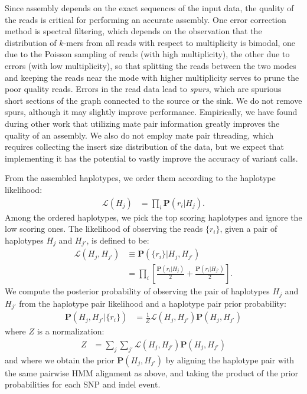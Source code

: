 \documentclass{acm_proc_article-sp}
\begin{document}
Since assembly depends on the exact sequences of the input data, the quality of
the reads is critical for performing an accurate assembly.
One error correction method is spectral filtering, which depends on the
observation that the distribution of $k$-mers from all reads with respect to
multiplicity is bimodal, one due to the Poisson sampling of reads (with high
multiplicity), the other due to errors (with low multiplicity), so that splitting
the reads between the two modes and keeping the reads near the mode with higher
multiplicity serves to prune the poor quality reads. %
Errors in the read data lead to \emph{spurs}, which are spurious short sections
of the graph connected to the source or the sink.
We do not remove spurs, although it may slightly improve performance.
Empirically, we have found during other work that utilizing mate pair
information greatly improves the quality of an assembly. %
We also do not employ mate pair threading, which requires collecting the
insert size distribution of the data, but we expect that implementing it has
the potential to vastly improve the accuracy of variant calls.

From the assembled haplotypes, we order them according to the haplotype
likelihood:
\begin{align}
  \mathcal L(H_j)
  &=\prod_i\mathbf P(r_i|H_j).
\end{align}
Among the ordered haplotypes, we pick the top scoring haplotypes and ignore
the low scoring ones.
The likelihood of observing the reads $\{r_i\}$, given a pair of haplotypes
$H_j$ and $H_{j'}$, is defined to be: %
\begin{align}
  \mathcal L(H_j,H_{j'})
  &\equiv\mathbf P(\{r_i\}|H_j,H_{j'}) \\ \nonumber
  &=\prod_i\left[ \frac{\mathbf P(r_i|H_j) }{2} + \frac{\mathbf P(r_i|H_{j'})}{2} \right].
\end{align}
We compute the posterior probability of observing the pair of haplotypes
$H_j$ and $H_{j'}$ from the haplotype pair likelihood and a haplotype pair
prior probability:
\begin{align}
  \mathbf P (H_j,H_{j'}|\{r_i\})&=\frac{1}{Z}\mathcal L(H_j,H_{j'})\mathbf P(H_j,H_{j'})
\end{align}
where $Z$ is a normalization:
\begin{align*}
  Z&=\sum_j\sum_{j'}\mathcal L(H_j,H_{j'})\mathbf P(H_j,H_{j'})
\end{align*}
and where we obtain the prior $\mathbf P (H_j,H_{j'})$ by aligning the haplotype
pair with the same pairwise HMM alignment as above, and taking the product of
the prior probabilities for each SNP and indel event. %
\end{document}
